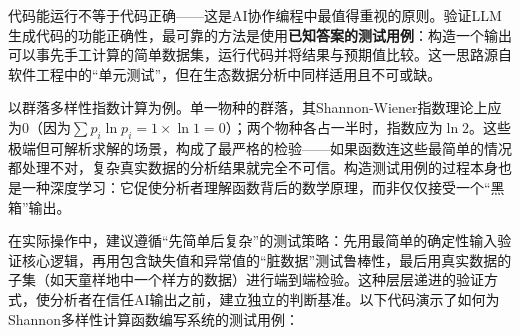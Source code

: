 \documentclass[
  twoside,12pt,fontset=none]{ctexbook}
\begin{document}
代码能运行不等于代码正确------这是AI协作编程中最值得重视的原则。验证LLM生成代码的功能正确性，最可靠的方法是使用\textbf{已知答案的测试用例}：构造一个输出可以事先手工计算的简单数据集，运行代码并将结果与预期值比较。这一思路源自软件工程中的``单元测试''，但在生态数据分析中同样适用且不可或缺。

以群落多样性指数计算为例。单一物种的群落，其Shannon-Wiener指数理论上应为0（因为\(\sum p_i \ln p_i = 1 \times \ln 1 = 0\)）；两个物种各占一半时，指数应为\(\ln 2\)。这些极端但可解析求解的场景，构成了最严格的检验------如果函数连这些最简单的情况都处理不对，复杂真实数据的分析结果就完全不可信。构造测试用例的过程本身也是一种深度学习：它促使分析者理解函数背后的数学原理，而非仅仅接受一个``黑箱''输出。

在实际操作中，建议遵循``先简单后复杂''的测试策略：先用最简单的确定性输入验证核心逻辑，再用包含缺失值和异常值的``脏数据''测试鲁棒性，最后用真实数据的子集（如天童样地中一个样方的数据）进行端到端检验。这种层层递进的验证方式，使分析者在信任AI输出之前，建立独立的判断基准。以下代码演示了如何为Shannon多样性计算函数编写系统的测试用例：
\end{document}
